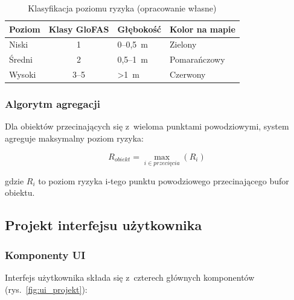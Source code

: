 \begin{table}[H]
    \centering
    \caption{Klasyfikacja poziomu ryzyka (opracowanie własne)}
    \begin{tabular}{|l|c|l|l|}
        \hline
        \textbf{Poziom} & \textbf{Klasy GloFAS} & \textbf{Głębokość} & \textbf{Kolor na mapie} \\
        \hline
        Niski & 1 & 0--0,5~m & Zielony \\
        \hline
        Średni & 2 & 0,5--1~m & Pomarańczowy \\
        \hline
        Wysoki & 3--5 & >1~m & Czerwony \\
        \hline
    \end{tabular}
    \label{tab:klasyfikacja_ryzyka}
\end{table}

\subsubsection{Algorytm agregacji}

Dla obiektów przecinających się z~wieloma punktami powodziowymi, system agreguje maksymalny poziom ryzyka:

\begin{equation}
    R_{obiekt} = \max_{i \in przecięcia}(R_i)
\end{equation}

gdzie $R_i$ to poziom ryzyka i-tego punktu powodziowego przecinającego bufor obiektu.

\subsection{Projekt interfejsu użytkownika}

\subsubsection{Komponenty UI}

Interfejs użytkownika składa się z~czterech głównych komponentów (rys.~\ref{fig:ui_projekt}):


